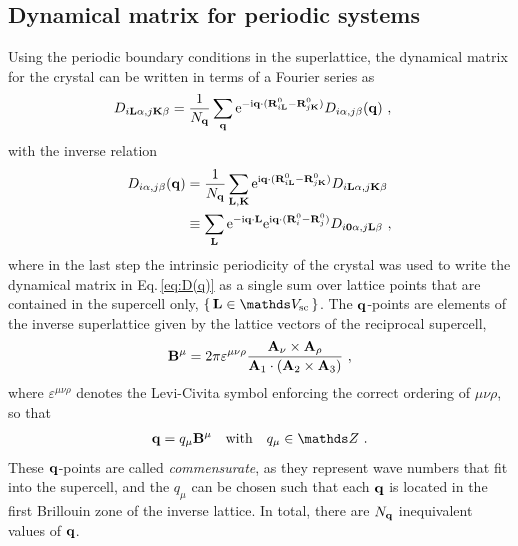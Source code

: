 
\subsection{Dynamical matrix for periodic systems}
Using the periodic boundary conditions in the superlattice, the dynamical matrix for the crystal can be written in terms of a Fourier series as
\begin{align}
	D_{i \b L \alpha, j \b K \beta}  
		& = \frac{1}{N_{\bf q}} \sum_{\b q} {\rm e}^{- \im \b q \cdot (\b R_{i \b L}^0 - \b R_{j \b K}^0)} {D}_{i \alpha, j \beta} (\b q)~,
	\label{eq:D_{iLa}}
\end{align}
with the inverse relation
\begin{align}
	{D}_{i \alpha, j \beta} (\b q) 	
		&= \frac{1}{N_{\bf q}} 
			\sum_{\b L, \b K} 
			{\rm e}^{\im \b q \cdot (\b R^0_{i \b L} - \b R^0_{j \b K})} {D}_{i \b L \alpha, j \b K \beta} \\
		&\equiv \sum_{\b L} {\rm e}^{- \im \b q \cdot \b L} {\rm e}^{\im \b q \cdot (\b R_i^0 - \b R_j^0)} {D}_{i \b 0 \alpha, j \b L \beta}~,
	\label{eq:D(q)}
\end{align}
where in the last step the intrinsic periodicity of the crystal was used
to write the dynamical matrix in Eq.\,\eqref{eq:D(q)} as a single sum over lattice points that are contained in the supercell only, $\set{\b L \in \mathds V_{\rm sc}}$.
The $\bf q$-points are elements of the inverse superlattice given by the lattice vectors of the reciprocal supercell,
\begin{align}
{\bf B}^\mu
= 2 \pi \varepsilon^{\mu \nu \rho} \frac{{\bf A}_\nu \times {\bf A}_\rho}{{\bf A}_1 \cdot ({\bf A}_2 \times {\bf A}_3)} ~,
\end{align}
where $\varepsilon^{\mu \nu \rho}$ denotes the Levi-Civita symbol enforcing the correct ordering of $\mu \nu \rho$, so that
\begin{align}
{\bf q} %
= %
q_\mu {\bf B}^\mu\quad\text{with}\quad q_\mu \in \mathds Z~.
\label{eq:q_m}
\end{align}
These ${\bf q}$-points are called \emph{commensurate}, as they represent wave numbers that fit into the supercell, and the $q_\mu$ can be chosen such that each $\bf q$ is located in the first Brillouin zone of the inverse lattice. In total, there are $N_{\bf q}$ inequivalent values of $\bf q$.

